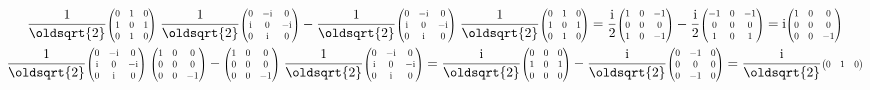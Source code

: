 \documentclass[10pt,a4paper]{article}
\newcommand{\const}[1]{\text{#1}}
\newcommand{\mat}[1]{
    \begin{pmatrix}
        #1
    \end{pmatrix}
}
\newcommand{\smat}[2][1]{
    \scalebox{#1}{$\mat{#2}$}
}
\renewcommand{\i}{\const{i}}
\begin{document}
\begin{gather*}
    \frac{1}{\oldsqrt{2}} \smat[0.7]{
        0 & 1 & 0 \\
        1 & 0 & 1 \\
        0 & 1 & 0
    }
    \;
    \frac{1}{\oldsqrt{2}} \smat[0.7]{
        0 & -\i & 0 \\
        \i & 0 & -\i \\
        0 & \i & 0
    }
    -
    \frac{1}{\oldsqrt{2}} \smat[0.7]{
        0 & -\i & 0 \\
        \i & 0 & -\i \\
        0 & \i & 0
    }
    \;
    \frac{1}{\oldsqrt{2}} \smat[0.7]{
        0 & 1 & 0 \\
        1 & 0 & 1 \\
        0 & 1 & 0
    }
    =
    \frac{\i}{2} \smat[0.7]{
        1 & 0 & -1 \\
        0 & 0 &  0 \\
        1 & 0 & -1
    }
    -
    \frac{\i}{2} \smat[0.7]{
        -1 & 0 & -1 \\
        0 & 0 & 0 \\
        1 & 0 & 1
    }
    =
    \i \smat[0.7]{
        1 & 0 & 0 \\
        0 & 0 & 0 \\
        0 & 0 & -1
    }
    \\
    \frac{1}{\oldsqrt{2}} \smat[0.7]{
        0 & -\i & 0 \\
        \i & 0 & -\i \\
        0 & \i & 0
    }
    \;
    \smat[0.7]{
        1 & 0 & 0 \\
        0 & 0 & 0 \\
        0 & 0 & -1
    }
    -
    \smat[0.7]{
        1 & 0 & 0 \\
        0 & 0 & 0 \\
        0 & 0 & -1
    }
    \;
    \frac{1}{\oldsqrt{2}} \smat[0.7]{
        0 & -\i & 0 \\
        \i & 0 & -\i \\
        0 & \i & 0
    }
    =
    \frac{\i}{\oldsqrt{2}} \smat[0.7]{
        0 & 0 & 0 \\
        1 & 0 & 1 \\
        0 & 0 & 0
    }
    -
    \frac{\i}{\oldsqrt{2}} \smat[0.7]{
        0 & -1 & 0 \\
        0 &  0 & 0 \\
        0 & -1 & 0
    }
    =
    \frac{\i}{\oldsqrt{2}} \smat[0.7]{
        0 & 1 & 0 \\
}
\end{gather*}
\end{document}
